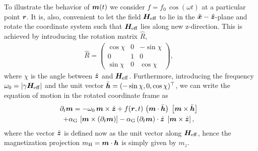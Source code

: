 To illustrate the behavior of $\boldsymbol{m}(t)$ we consider $f=f_0\,\cos(\omega t)$ at a particular point $\boldsymbol{r}$. It is, also, convenient to let the field $\boldsymbol{H}_\mathrm{eff}$ to lie in the $\hat{\boldsymbol{x}}-\hat{\boldsymbol{z}}$-plane and rotate the coordinate system such that $\boldsymbol{H}_\mathrm{eff}$ lies along new z-direction. This is achieved by introducing the rotation matrix $\hat{R}$,  
\begin{align}
    \hat{R} = \begin{pmatrix} \cos\chi & 0 & -\sin \chi \\ 0 & 1 & 0 \\ \sin\chi & 0 & \cos\chi\end{pmatrix},
\end{align}
where $\chi$ is the angle between $\hat{\boldsymbol{z}}$ and $\boldsymbol{H}_\mathrm{eff}$. Furthermore, introducing the frequency $\omega_0 = |\gamma\boldsymbol{H}_\mathrm{eff}|$ and the unit vector $\bar{\boldsymbol{h}}=(-\sin\chi,0,\cos\chi)^\top$, we can write the equation of motion in the rotated coordinate frame as
\begin{multline}
    \partial_t \boldsymbol{m} = -\omega_0\,\boldsymbol{m}\times \hat{\boldsymbol{z}}+f(\boldsymbol{r},t)\,\left(\boldsymbol{m}\cdot\bar{\boldsymbol{h}}\right)\;\left[\boldsymbol{m}\times\bar{\boldsymbol{h}}\right]
    \\+
    \alpha_\textrm{G}\, \left[\boldsymbol{m}\times (\partial_t\boldsymbol{m})\right]
    -\alpha_\textrm{G}\, (\partial_t \boldsymbol{m})\cdot \hat{\boldsymbol{z}}\;\left[\boldsymbol{m}\times \hat{\boldsymbol{z}}\right],
    \label{dynamicEQ}
\end{multline}
where the vector $\hat{\boldsymbol{z}}$ is defined now as the unit vector along $\boldsymbol{H}_\mathrm{eff}$, hence the magnetization projection $m_\text{H}=\boldsymbol{m}\cdot\boldsymbol{h}$ is simply given by $m_z$. 



